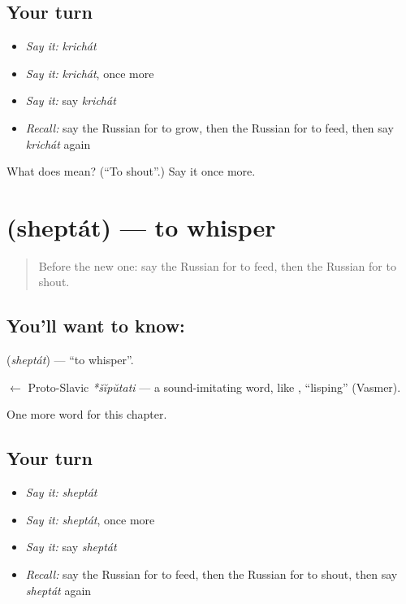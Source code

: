 \subsection*{Your turn}
\begin{itemize}
\raggedright
  \item \emph{Say it:} \emph{krichát}
  \item \emph{Say it:} \emph{krichát}, once more
  \item \emph{Say it:} say \emph{krichát}
  \item \emph{Recall:} say the Russian for to grow, then the Russian for to feed, then say \emph{krichát} again
\end{itemize}

\begin{tcolorbox}[breakable,colback=teal!4,colframe=teal!35!black,title={Before you move on}]
What does  mean? (\textquotedblleft{}To shout\textquotedblright{}.) Say it once more.
\end{tcolorbox}
\section[\texorpdfstring{\ru{шептать} (sheptát)}{шептать (sheptát)}]{ (sheptát) — to whisper}

\label{lesson:RU-C235-sheptat}



\begin{quote}
Before the new one: say the Russian for to feed, then the Russian for to shout.
\end{quote}

\subsection*{You'll want to know: }
\textbf{} (\emph{sheptát}) — \textquotedblleft{}to whisper\textquotedblright{}.

\begin{cousinweb}
\textbf{} $\leftarrow$ Proto-Slavic \emph{*šĭpŭtati} — a sound-imitating word, like \emph{}, \textquotedblleft{}lisping\textquotedblright{} (Vasmer).
\end{cousinweb}

\begin{grammarlens}[title={What you've built}]
One more word for this chapter.
\end{grammarlens}

\subsection*{Your turn}
\begin{itemize}
\raggedright
  \item \emph{Say it:} \emph{sheptát}
  \item \emph{Say it:} \emph{sheptát}, once more
  \item \emph{Say it:} say \emph{sheptát}
  \item \emph{Recall:} say the Russian for to feed, then the Russian for to shout, then say \emph{sheptát} again
\end{itemize}


